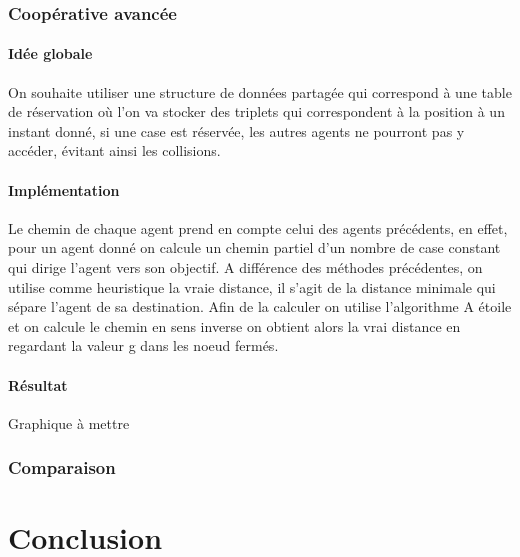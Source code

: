 \documentclass{article}
\begin{document}
		\section{Coopérative avancée}

			\subsection{Idée globale}
			On souhaite utiliser une structure de données partagée qui correspond à une table de réservation où l'on va stocker des triplets qui correspondent à la position à un instant donné, si une case est réservée, les autres agents ne pourront pas y accéder, évitant ainsi les collisions.

			\subsection{Implémentation}
			Le chemin de chaque agent prend en compte celui des agents précédents, en effet, pour un agent donné on calcule un chemin partiel d'un nombre de case constant qui dirige l'agent vers son objectif. A différence des méthodes précédentes, on utilise comme heuristique la vraie distance, il s'agit de la distance minimale qui sépare l'agent de sa destination. Afin de la calculer on utilise l'algorithme A étoile et on calcule le chemin en sens inverse on obtient alors la vrai distance en regardant la valeur g dans les noeud fermés.
			
			\subsection{Résultat}
			Graphique à mettre
					
		\section{Comparaison}
	
	\part{Conclusion}
		
\end{document}
